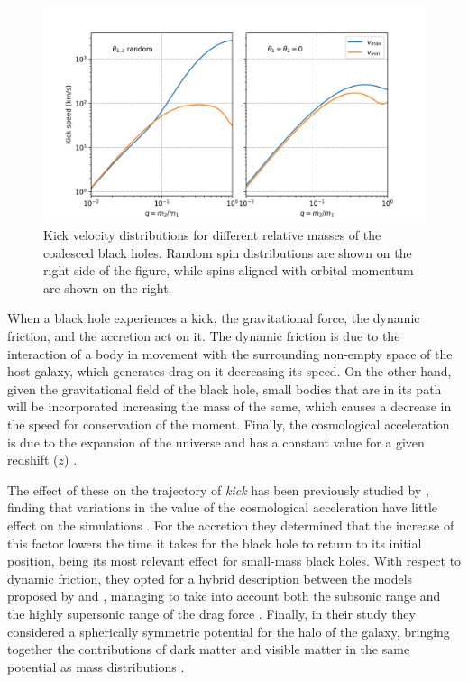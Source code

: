 	\begin{figure}[h]
		\centering
		\includegraphics[width=0.9\linewidth]{"../Files/Week 10/Tanaka"}
		\caption{Kick velocity distributions for different relative masses of the coalesced black holes. Random spin distributions are shown on the right side of the figure, while spins aligned with orbital momentum are shown on the right.}
		\label{fig: tanakaSpeeds}
	\end{figure}
	
	When a black hole experiences a kick, the gravitational force, the dynamic friction, and the accretion act on it. The dynamic friction is due to the interaction of a body in movement with the surrounding non-empty space of the host galaxy, which generates drag on it decreasing its speed. On the other hand, given the gravitational field of the black hole, small bodies that are in its path will be incorporated increasing the mass of the same, which causes a decrease in the speed for conservation of the moment. Finally, the cosmological acceleration is due to the expansion of the universe and has a constant value for a given redshift ($z$) \cite{choksi2017recoiling}.
	
	The effect of these on the trajectory of \textit{kick} has been previously studied by \citeauthor{choksi2017recoiling}, finding that variations in the value of the cosmological acceleration have little effect on the simulations \cite{choksi2017recoiling}. For the accretion they determined that the increase of this factor lowers the time it takes for the black hole to return to its initial position, being its most relevant effect for small-mass black holes. With respect to dynamic friction, they opted for a hybrid description between the models proposed by \citeauthor{ostriker1999dynamical} and \citeauthor{escala2005role}, managing to take into account both the subsonic range and the highly supersonic range of the drag force \cite{ostriker1999dynamical, escala2005role}. Finally, in their study they considered a spherically symmetric potential for the halo of the galaxy, bringing together the contributions of dark matter and visible matter in the same potential as mass distributions \cite{choksi2017recoiling}.
	
